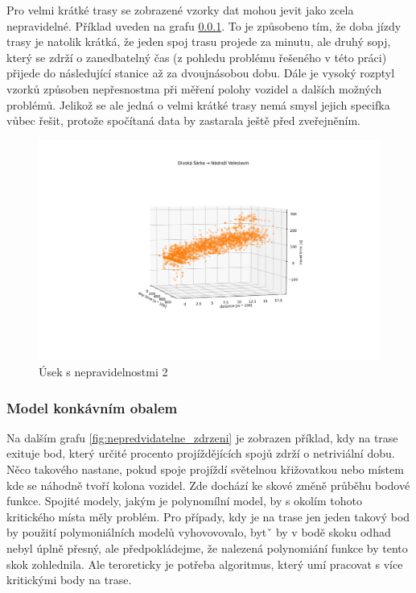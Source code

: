Pro velmi krátké trasy se zobrazené vzorky dat mohou jevit jako zcela nepravidelné. Příklad uveden na grafu \ref{}. To je způsobeno tím, že doba jízdy trasy je natolik krátká, že jeden spoj trasu projede za minutu, ale druhý sopj, který se zdrží o zanedbatelný čas (z pohledu problému řešeného v této práci) přijede do následující stanice až za dvoujnásobou dobu. Dále je vysoký rozptyl vzorků způsoben nepřesnostma při měření polohy vozidel a dalších možných problémů. Jelikož se ale jedná o velmi krátké trasy nemá smysl jejich specifka vůbec řešit, protože spočítaná data by zastarala ještě před zveřejněním.

\begin{figure}
	\centering
  \includegraphics[width=\linewidth]{../img/divoka_sarka_veleslavin.png}
  \caption{Úsek s nepravidelnostmi 2}
  \label{fig:divoka_sarka_veleslavin}
\end{figure}

\subsubsection{Model konkávním obalem}

Na dalším grafu \ref{fig:nepredvidatelne_zdrzeni} je zobrazen příklad, kdy na trase exituje bod, který určité procento projíždějících spojů zdrží o netriviální dobu. Něco takového nastane, pokud spoje projíždí světelnou křižovatkou nebo místem kde se náhodně tvoří kolona vozidel. Zde dochází ke skové změně průběhu bodové funkce. Spojité modely, jakým je polynomílní model, by s okolím tohoto kritického místa měly problém. Pro případy, kdy je na trase jen jeden takový bod by použití polymoniálních modelů vyhovovovalo, bytˇ by v bodě skoku odhad nebyl úplně přesný, ale předpokládejme, že nalezená polynomiání funkce by tento skok zohlednila. Ale teroreticky je potřeba algoritmus, který umí pracovat s více kritickými body na trase.

